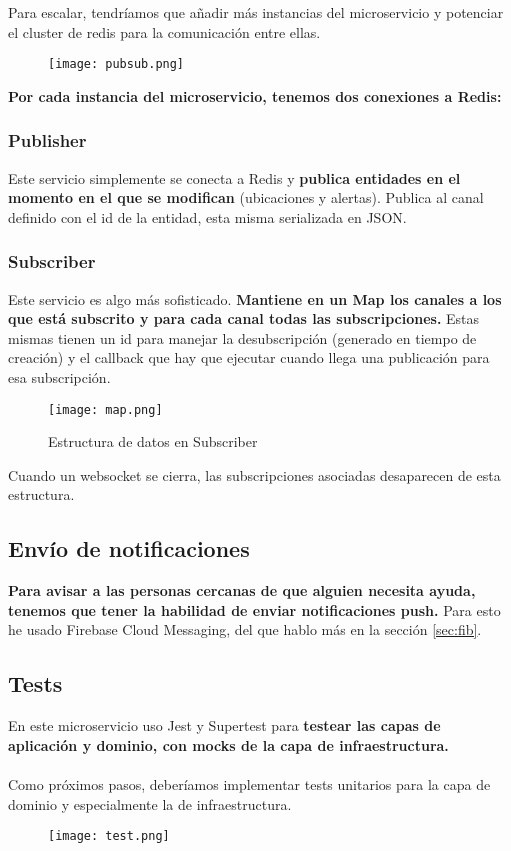 Para escalar, tendríamos que añadir más instancias del microservicio y potenciar el cluster de redis para la comunicación entre ellas.

\begin{figure}[H]
	\centering	
	\texttt{[image: pubsub.png]}
	\end{figure}

\textbf{Por cada instancia del microservicio, tenemos dos conexiones a Redis:}
\subsubsection{Publisher}

Este servicio simplemente se conecta a Redis y \textbf{publica entidades en el momento en el que se modifican} (ubicaciones y alertas).
Publica al canal definido con el id de la entidad, esta misma serializada en JSON.

\subsubsection{Subscriber}
Este servicio es algo más sofisticado. \textbf{Mantiene en un Map los canales a los que está subscrito y 
para cada canal todas las subscripciones.} Estas mismas tienen un id para manejar la desubscripción (generado en tiempo de creación) y 
el callback que hay que ejecutar cuando llega una publicación para esa subscripción. 
\begin{figure}[H]
	\centering	
	\texttt{[image: map.png]}
	\caption{Estructura de datos en Subscriber}
	\end{figure}
Cuando un websocket se cierra, las subscripciones asociadas desaparecen de esta estructura.
\subsection{Envío de notificaciones}\label{sec:fibpre}
\textbf{Para avisar a las personas cercanas de que alguien necesita ayuda, tenemos que tener la habilidad de enviar
notificaciones push.} Para esto he usado Firebase Cloud Messaging, del que hablo más en la sección \ref{sec:fib}.

\subsection{Tests}\label{sec:tests}
En este microservicio uso Jest y Supertest \cite{supertest} para \textbf{testear las capas de aplicación y dominio, con mocks de la capa de infraestructura.} \\ \\
Como próximos pasos, deberíamos implementar tests unitarios para la capa de dominio y especialmente la de infraestructura.
\begin{figure}[H]
	\centering	
	\texttt{[image: test.png]}
	\end{figure}

